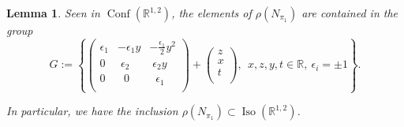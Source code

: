 \documentclass[11pt]{article}
\newtheorem{lemm}[theo]{Lemma}
\theoremstyle{definition}
\numberwithin{equation}{section}
\numberwithin{figure}{section}
\numberwithin{table}{section}
\DeclareMathOperator{\Conf}{Conf}
\DeclareMathOperator{\Iso}{Iso}
\newcommand*\RR{\mathbb{R}}
\begin{document}
\begin{lemm}\label{lem.normalisateur}
Seen in $\Conf(\RR^{1,2})$, the elements of $\rho(N_{\pi_1})$ are contained in the group
\[
G:=\left\lbrace
\begin{pmatrix}
\epsilon_1&- \epsilon_1 y&-\frac{\epsilon_1}{2 }y^2\\ 0&\;\epsilon_2 & \;\epsilon_2 y\\0&\;\;0&\;\;\epsilon_1\\
\end{pmatrix} +
\begin{pmatrix} z\\ x\\ t \\
\end{pmatrix}, \ \ x,z,y,t \in \RR, \ \epsilon_i=\pm 1 \right\rbrace.
\]

In particular, we have the inclusion $\rho(N_{\pi_1}) \subset \Iso(\RR^{1,2})$.
\end{lemm}
\end{document}
